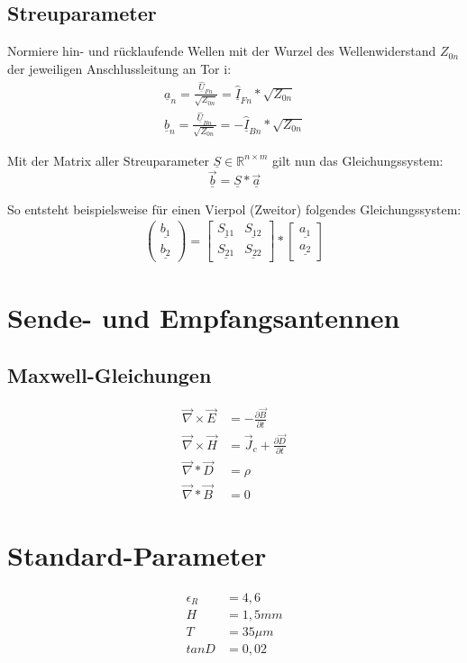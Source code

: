 \documentclass[11pt]{scrartcl}
\def\Uc{\underline{\hat U}}
\def\Ic{\underline{\hat I}}
\begin{document}
\subsection{Streuparameter}
Normiere hin- und rücklaufende Wellen mit der Wurzel des Wellenwiderstand $Z_{0n}$ der jeweiligen Anschlussleitung an Tor i:
\begin{eqnarray}
	\underline{a}_n = \frac{\Uc_{Fn}}{\sqrt{Z_{0n}}}=\Ic_{Fn}*\sqrt{Z_{0n}} \\ 
	\underline{b}_n = \frac{\Uc_{Bn}}{\sqrt{Z_{0n}}}=-\Ic_{Bn}*\sqrt{Z_{0n}} 
\end{eqnarray}
\begin{mdframed}[backgroundcolor = sand]
	Mit der Matrix aller Streuparameter $\underline{S} \in \mathbb{R}^{n\times m}$ gilt nun das Gleichungssystem:
	\begin{equation}
		\vec{\underline{b}} = \underline{S}*\vec{\underline{a}}
	\end{equation} 
\end{mdframed}
So entsteht beispielsweise für einen Vierpol (Zweitor) folgendes Gleichungssystem:
\begin{eqnarray}
	\begin{pmatrix}
		\underline{b_1} \\
		\underline{b_2}
	\end{pmatrix}
	= 
	\begin{bmatrix}
		\underline{S_{11}} & \underline{S_{12}} \\
		\underline{S_{21}} & \underline{S_{22}}
	\end{bmatrix}
	*
	\begin{bmatrix}
		\underline{a_1} \\
		\underline{a_2}
	\end{bmatrix}
\end{eqnarray}

\section{Sende- und Empfangsantennen}
\subsection{Maxwell-Gleichungen}
\begin{align}
		\vec{\nabla} \times \vec{E} &= -\frac{\partial \vec{B}}{\partial t} \\
		\vec{\nabla} \times \vec{H} &= \vec{J}_c+\frac{\partial \vec{D}}{\partial t} \\
		\vec{\nabla} * \vec{D} &= \rho \\
		\vec{\nabla} * \vec{B} &= 0
\end{align}





 \section{Standard-Parameter}
\begin{align}
\epsilon_R&=4,6 \\
H&=1,5mm\\
T&=35\mu m\\
tanD&=0,02
\end{align}
\end{document}
